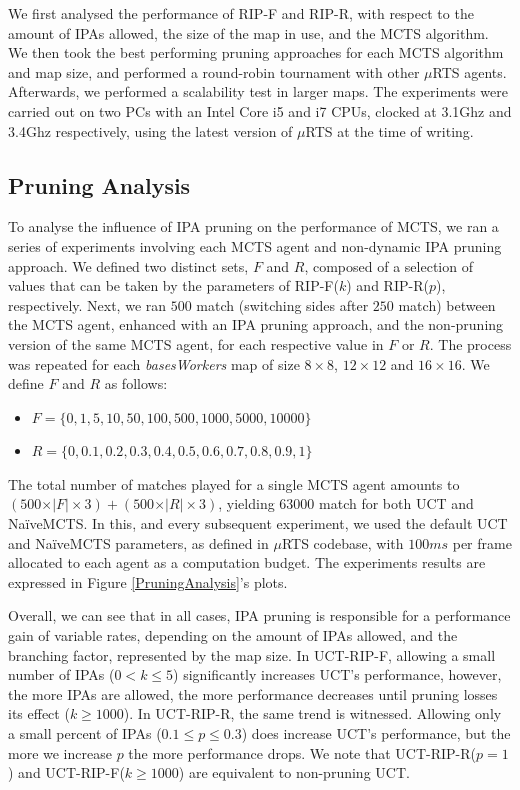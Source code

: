 \documentclass[conference]{IEEEtran}
\newcommand{\mRTS}{$\mu$RTS}
\begin{document}
We first analysed the performance of RIP-F and RIP-R, with respect to the amount of IPAs allowed, the size of the map in use, and the MCTS algorithm. We then took the best performing pruning approaches for each MCTS algorithm and map size, and performed a round-robin tournament with other \mRTS{} agents. Afterwards, we performed a scalability test in larger maps. The experiments were carried out on two PCs with an Intel Core i5 and i7 CPUs, clocked at 3.1Ghz and 3.4Ghz respectively, using the latest version of \mRTS{} at the time of writing.


\subsection{Pruning Analysis}

To analyse the influence of IPA pruning on the performance of MCTS, we ran a series of experiments involving each MCTS agent and non-dynamic IPA pruning approach. We defined two distinct sets, $F$ and $R$, composed of a selection of values that can be taken by the parameters of RIP-F($k$) and RIP-R($p$), respectively. Next, we ran $500$ match (switching sides after $250$ match) between the MCTS agent, enhanced with an IPA pruning approach, and the non-pruning version of the same MCTS agent, for each respective value in $F$ or $R$. The process was repeated for each \textit{basesWorkers} map of size $8\times8$, $12\times12$ and $16\times16$. We define $F$ and $R$ as follows:

\begin{itemize}
\item $F = \{0, 1, 5, 10, 50, 100, 500, 1000, 5000, 10000\}$
\item $R = \{0, 0.1, 0.2, 0.3, 0.4, 0.5, 0.6, 0.7, 0.8, 0.9, 1\}$
\end{itemize}

The total number of matches played for a single MCTS agent amounts to $(500\times\vert F\vert\times3) + (500\times\vert R\vert\times3)$, yielding $63000$ match for both UCT and NaïveMCTS. In this, and every subsequent experiment, we used the default UCT and NaïveMCTS parameters, as defined in \mRTS{} codebase, with $100ms$ per frame allocated to each agent as a computation budget. The experiments results are expressed in Figure \ref{PruningAnalysis}'s plots.

Overall, we can see that in all cases, IPA pruning is responsible for a performance gain of variable rates, depending on the amount of IPAs allowed, and the branching factor, represented by the map size. In UCT-RIP-F, allowing a small number of IPAs ($0 < k \leq 5$) significantly increases UCT's performance, however, the more IPAs are allowed, the more performance decreases until pruning losses its effect ($k \geq 1000$). In UCT-RIP-R, the same trend is witnessed. Allowing only a small percent of IPAs ($0.1 \leq p \leq 0.3$) does increase UCT's performance, but the more we increase $p$ the more performance drops. We note that UCT-RIP-R($p=1$) and UCT-RIP-F($k \geq 1000$) are equivalent to non-pruning UCT. 
\end{document}
